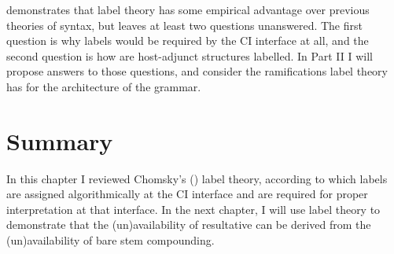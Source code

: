 \documentclass[MilwayThesis]{subfiles}
\begin{document}
\textcite{chomsky2015problems} demonstrates that label theory has some empirical advantage over previous theories of syntax, but leaves at least two questions unanswered.
The first question is why labels would be required by the CI interface at all, and the second question is how are host-adjunct structures labelled.
In Part II I will propose answers to those questions, and consider the ramifications label theory has for the architecture of the grammar.

\section{Summary}
In this chapter I reviewed Chomsky's (\citeyear{chomsky2013problems,chomsky2015problems}) label theory, according to which labels are assigned algorithmically at the CI interface and are required for proper interpretation at that interface.
In the next chapter, I will use label theory to demonstrate that the (un)availability of resultative can be derived from the (un)availability of bare stem compounding.
\end{document}
